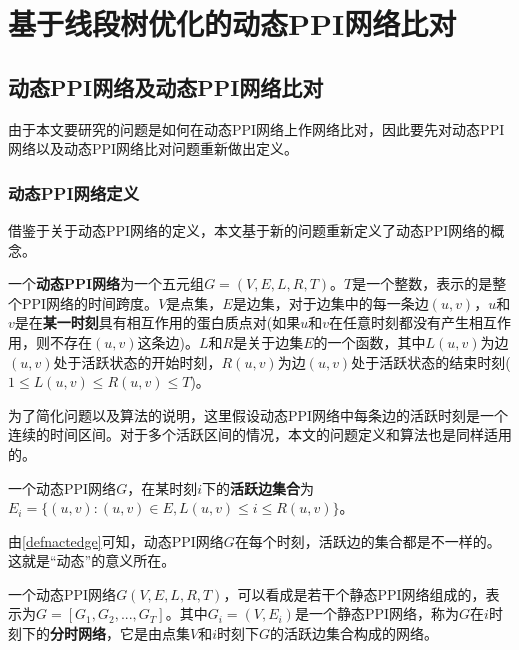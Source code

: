 \renewcommand{\algorithmicrequire}{\textbf{Input:}}
\renewcommand{\algorithmicensure}{\textbf{Output:}}
\chapter{基于线段树优化的动态PPI网络比对}
\section{动态PPI网络及动态PPI网络比对}
由于本文要研究的问题是如何在动态PPI网络上作网络比对，因此要先对动态PPI网络以及动态PPI网络比对问题重新做出定义。

\subsection{动态PPI网络定义}
借鉴于\cite{zhang2016method}关于动态PPI网络的定义，本文基于新的问题重新定义了动态PPI网络的概念。

\begin{defn}[动态PPI网络]
\label{defndppi}
一个\textbf{动态PPI网络}为一个五元组$G=(V,E,L,R,T)$。$T$是一个整数，表示的是整个PPI网络的时间跨度。$V$是点集，$E$是边集，对于边集中的每一条边$(u,v)$，$u$和$v$是在\textbf{某一时刻}具有相互作用的蛋白质点对(如果$u$和$v$在任意时刻都没有产生相互作用，则不存在$(u,v)$这条边)。$L$和$R$是关于边集$E$的一个函数，其中$L(u,v)$为边$(u,v)$处于活跃状态的开始时刻，$R(u,v)$为边$(u,v)$处于活跃状态的结束时刻($1\leq L(u,v)\leq R(u,v)\leq T$)。
\end{defn}
为了简化问题以及算法的说明，这里假设动态PPI网络中每条边的活跃时刻是一个连续的时间区间。对于多个活跃区间的情况，本文的问题定义和算法也是同样适用的。

\begin{defn}[活跃边集合]
\label{defnactedge}
一个动态PPI网络$G$，在某时刻$i$下的\textbf{活跃边集合}为$E_i=\{(u,v):(u,v)\in E,L(u,v)\leq i\leq R(u,v)\}$。
\end{defn}

由\ref{defnactedge}可知，动态PPI网络$G$在每个时刻，活跃边的集合都是不一样的。这就是“动态”的意义所在。

\begin{defn}[分时网络]
\label{defnpartnetwork}
一个动态PPI网络$G(V,E,L,R,T)$，可以看成是若干个静态PPI网络组成的，表示为$G=[G_1,G_2,...,G_T]$。其中$G_i=(V,E_i)$是一个静态PPI网络，称为$G$在$i$时刻下的\textbf{分时网络}，它是由点集$V$和$i$时刻下$G$的活跃边集合构成的网络。
\end{defn}

